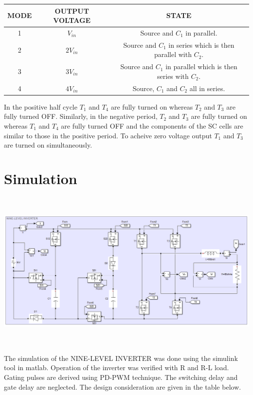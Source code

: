 \documentclass[12pt,a4paper]{report}
\begin{document}
\begin{center}
	\begin{tabular}{|c|c|c|} 
		\hline
		{\bf MODE} & {\bf OUTPUT VOLTAGE} & {\bf STATE} \\  
		\hline
		1 & $V_{in}$  & Source and $C_1$ in parallel. \\ 
		\hline
		2 & $2V_{in}$ & Source and $C_1$ in series which is then parallel with $C_2$. \\
		\hline
		3 & $3V_{in}$ & Source and $C_1$ in parallel which is then series with $C_2$. \\
		\hline
		4 & $4V_{in}$ & Source, $C_1$ and $C_2$ all in series. \\
		\hline
	\end{tabular}
\end{center}

In the positive half cycle $T_1$ and $T_4$ are fully turned on whereas $T_2$ and $T_3$ are fully turned OFF. Similarly, in the negative period, $T_2$ and $T_3$ are fully turned on whereas $T_1$ and $T_4$ are fully turned OFF and the components of the SC cells are similar to those in the positive period. To acheive zero voltage output $T_1$ and $T_3$ are turned on simultaneously.

\clearpage

\section*{Simulation}

\begin{center}
	\includegraphics[width=16cm,height=8cm]{figures/SIMULINK_CIRCUIT}
\end{center}

The simulation of the NINE-LEVEL INVERTER was done using the simulink tool in matlab.
Operation of the inverter was verified with R and R-L load. Gating pulses are derived using PD-PWM technique. The switching delay and gate delay are neglected. The design consideration are given in the table below. 
\end{document}
